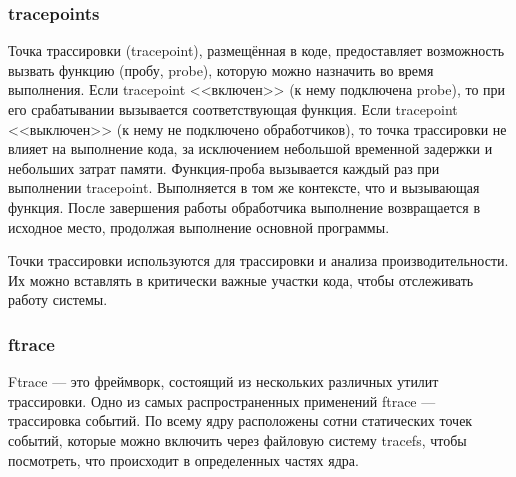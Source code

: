 \subsubsection*{tracepoints}

Точка трассировки (tracepoint), размещённая в коде, предоставляет возможность вызвать функцию (пробу, probe), которую можно назначить во время выполнения.
Если tracepoint <<включен>> (к нему подключена probe), то при его срабатывании вызывается соответствующая функция.
Если tracepoint <<выключен>> (к нему не подключено обработчиков), то точка трассировки не влияет на выполнение кода, за исключением небольшой временной задержки и небольших затрат памяти.
Функция-проба вызывается каждый раз при выполнении tracepoint.
Выполняется в том же контексте, что и вызывающая функция.
После завершения работы обработчика выполнение возвращается в исходное место, продолжая выполнение основной программы.

Точки трассировки используются для трассировки и анализа производительности.
Их можно вставлять в критически важные участки кода, чтобы отслеживать работу системы.~\cite{tracepoints}



\subsubsection*{ftrace}

Ftrace --- это фреймворк, состоящий из нескольких различных утилит трассировки.
Одно из самых распространенных применений ftrace --- трассировка событий.
По всему ядру расположены сотни статических точек событий, которые можно включить через файловую систему tracefs, чтобы посмотреть, что происходит в определенных частях ядра.~\cite{ftrace}



%
%

